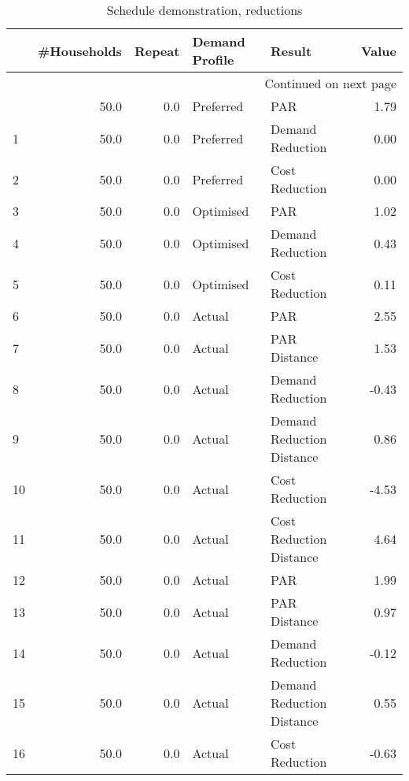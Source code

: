 \begin{longtable}{lrrllr}
\caption{Schedule demonstration, reductions}\label{tab:multiple:exp:demon}\\
\toprule
{} &  \#Households &  Repeat & Demand Profile &                     Result &  Value \\
\midrule
\endhead
\midrule
\multicolumn{6}{r}{{Continued on next page}} \\
\midrule
\endfoot

\bottomrule
\endlastfoot
0    &         50.0 &     0.0 &      Preferred &                        PAR &   1.79 \\
1    &         50.0 &     0.0 &      Preferred &           Demand Reduction &   0.00 \\
2    &         50.0 &     0.0 &      Preferred &             Cost Reduction &   0.00 \\
3    &         50.0 &     0.0 &      Optimised &                        PAR &   1.02 \\
4    &         50.0 &     0.0 &      Optimised &           Demand Reduction &   0.43 \\
5    &         50.0 &     0.0 &      Optimised &             Cost Reduction &   0.11 \\
6    &         50.0 &     0.0 &         Actual &                        PAR &   2.55 \\
7    &         50.0 &     0.0 &         Actual &               PAR Distance &   1.53 \\
8    &         50.0 &     0.0 &         Actual &           Demand Reduction &  -0.43 \\
9    &         50.0 &     0.0 &         Actual &  Demand Reduction Distance &   0.86 \\
10   &         50.0 &     0.0 &         Actual &             Cost Reduction &  -4.53 \\
11   &         50.0 &     0.0 &         Actual &    Cost Reduction Distance &   4.64 \\
12   &         50.0 &     0.0 &         Actual &                        PAR &   1.99 \\
13   &         50.0 &     0.0 &         Actual &               PAR Distance &   0.97 \\
14   &         50.0 &     0.0 &         Actual &           Demand Reduction &  -0.12 \\
15   &         50.0 &     0.0 &         Actual &  Demand Reduction Distance &   0.55 \\
16   &         50.0 &     0.0 &         Actual &             Cost Reduction &  -0.63 \\

\end{longtable}
